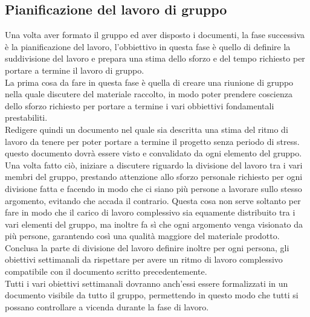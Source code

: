 \documentclass[11pt,a4paper]{article}
\begin{document}
	\subsection{Pianificazione del lavoro di gruppo} 
	Una volta aver formato il gruppo ed aver disposto i documenti, la fase successiva è la pianificazione del lavoro, l'obbiettivo in questa fase è quello di definire la suddivisione del lavoro e prepara una stima dello sforzo e del tempo richiesto per portare a termine il lavoro di gruppo.\\
	La prima cosa da fare in questa fase è quella di creare una riunione di gruppo nella quale discutere del materiale raccolto, in modo poter prendere coscienza dello sforzo richiesto per portare a termine i vari obbiettivi fondamentali prestabiliti.\\
	Redigere quindi un documento nel quale sia descritta una stima del ritmo di lavoro da tenere per poter portare a termine il progetto senza periodo di stress. questo documento dovrà essere visto e convalidato da ogni elemento del gruppo.
	Una volta fatto ciò, iniziare a discutere riguardo la divisione del lavoro tra i vari membri del gruppo, prestando attenzione allo sforzo personale richiesto per ogni divisione fatta e facendo in modo che ci siano più persone a lavorare sullo stesso argomento, evitando che accada il contrario. Questa cosa non serve soltanto per fare in modo che il carico di lavoro complessivo sia equamente distribuito tra i vari elementi del gruppo, ma inoltre fa sì che ogni argomento venga visionato da più persone, garantendo così una qualità maggiore del materiale prodotto. Conclusa la parte di divisione del lavoro definire inoltre per ogni persona, gli obiettivi settimanali da rispettare per avere un ritmo di lavoro complessivo compatibile con il documento scritto precedentemente.\\
	Tutti i vari obiettivi settimanali dovranno anch'essi essere formalizzati in un documento visibile da tutto il gruppo, permettendo in questo modo che tutti si possano controllare a vicenda durante la fase di lavoro.\\
	
\end{document}
